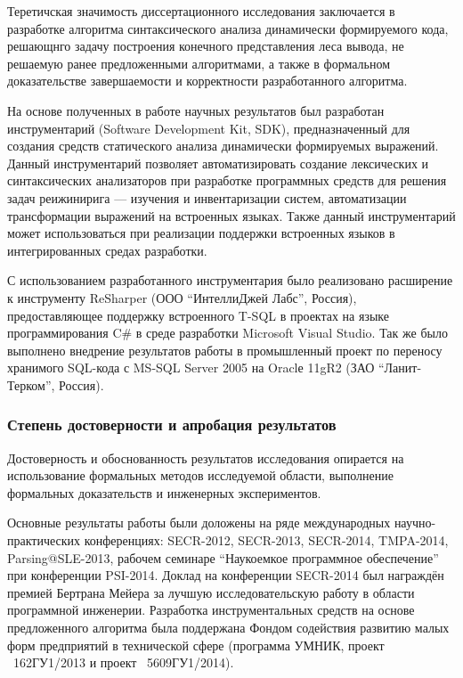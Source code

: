 Теретичская значимость диссертационного исследования заключается в разработке алгоритма синтаксического анализа динамически формируемого кода, решающнго задачу построения конечного представления леса вывода, не решаемую ранее предложенными алгоритмами, а также в формальном доказательстве завершаемости и корректности разработанного алгоритма. 

На основе полученных в работе научных результатов был разработан инструментарий (Software Development Kit, SDK), предназначенный для создания средств статического анализа динамически формируемых выражений. Данный инструментарий позволяет автоматизировать создание лексических и синтаксических анализаторов при разработке программных средств для решения задач реижинирига --- изучения и инвентаризации систем, автоматизации трансформации выражений на встроенных языках. Также данный инструментарий может использоваться при реализации поддержки встроенных языков в интегрированных средах разработки.

С использованием разработанного инструментария было реализовано расширение к инструменту ReSharper (ООО ``ИнтеллиДжей Лабс'', Россия), предоставляющее поддержку встроенного T-SQL в проектах на языке программирования C\# в среде разработки Microsoft Visual Studio. Так же было выполнено внедрение результатов работы в промышленный проект по переносу хранимого SQL-кода с MS-SQL Server 2005 на Oraclе 11gR2 (ЗАО ``Ланит-Терком'', Россия). 


\subsubsection*{\large{Степень достоверности и апробация результатов}}

Достоверность и обоснованность результатов исследования опирается на использование формальных методов исследуемой области, выполнение формальных доказательств и инженерных экспериментов.

Основные результаты работы были доложены на ряде международных научно-практических конференциях: SECR-2012, SECR-2013, SECR-2014, TMPA-2014, Parsing@SLE-2013, рабочем семинаре ``Наукоемкое программное обеспечение'' при конференции PSI-2014. Доклад на конференции SECR-2014 был награждён премией Бертрана Мейера за лучшую исследовательскую работу в области программной инженерии. Разработка инструментальных средств на основе предложенного алгоритма была поддержана Фондом содействия развитию малых форм предприятий в технической сфере (программа УМНИК, проект \textnumero~162ГУ1/2013 и проект \textnumero~5609ГУ1/2014).

